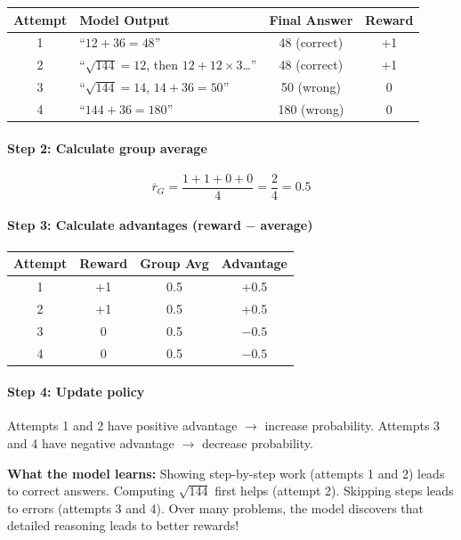 \begin{chapterenv}
\begin{center}
\begin{tabular}{clcc}
\toprule
\textbf{Attempt} & \textbf{Model Output} & \textbf{Final Answer} & \textbf{Reward} \\
\midrule
1 & ``$12 + 36 = 48$'' & 48 (correct) & +1 \\
2 & ``$\sqrt{144} = 12$, then $12 + 12 \times 3$\ldots'' & 48 (correct) & +1 \\
3 & ``$\sqrt{144} = 14$, $14 + 36 = 50$'' & 50 (wrong) & 0 \\
4 & ``$144 + 36 = 180$'' & 180 (wrong) & 0 \\
\bottomrule
\end{tabular}
\end{center}

\paragraph{Step 2: Calculate group average}

$$\bar{r}_G = \frac{1 + 1 + 0 + 0}{4} = \frac{2}{4} = 0.5$$

\paragraph{Step 3: Calculate advantages (reward $-$ average)}

\begin{center}
\begin{tabular}{cccc}
\toprule
\textbf{Attempt} & \textbf{Reward} & \textbf{Group Avg} & \textbf{Advantage} \\
\midrule
1 & +1 & 0.5 & +0.5 \\
2 & +1 & 0.5 & +0.5 \\
3 & 0 & 0.5 & $-0.5$ \\
4 & 0 & 0.5 & $-0.5$ \\
\bottomrule
\end{tabular}
\end{center}

\paragraph{Step 4: Update policy}

Attempts 1 and 2 have positive advantage $\to$ increase probability. Attempts 3 and 4 have negative advantage $\to$ decrease probability.

\textbf{What the model learns:} Showing step-by-step work (attempts 1 and 2) leads to correct answers. Computing $\sqrt{144}$ first helps (attempt 2). Skipping steps leads to errors (attempts 3 and 4). Over many problems, the model discovers that detailed reasoning leads to better rewards!


\end{chapterenv}
